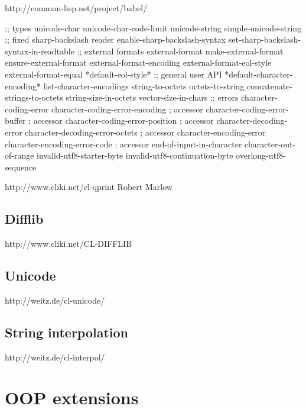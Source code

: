 \documentclass[10pt,english]{book}
\begin{document}
http://common-lisp.net/project/babel/

   ;; types
   unicode-char
   unicode-char-code-limit
   unicode-string
   simple-unicode-string
   ;; fixed sharp-backslash reader
   enable-sharp-backslash-syntax
   set-sharp-backslash-syntax-in-readtable
   ;; external formats
   external-format
   make-external-format
   ensure-external-format
   external-format-encoding
   external-format-eol-style
   external-format-equal
   *default-eol-style*
   ;; general user API
   *default-character-encoding*
   list-character-encodings
   string-to-octets
   octets-to-string
   concatenate-strings-to-octets
   string-size-in-octets
   vector-size-in-chars
   ;; errors
   character-coding-error
   character-coding-error-encoding    ; accessor
   character-coding-error-buffer      ; accessor
   character-coding-error-position    ; accessor
   character-decoding-error
   character-decoding-error-octets    ; accessor
   character-encoding-error
   character-encoding-error-code      ; accessor
   end-of-input-in-character
   character-out-of-range
   invalid-utf8-starter-byte
   invalid-utf8-continuation-byte
   overlong-utf8-sequence


http://www.cliki.net/cl-qprint
Robert Marlow

\section{Difflib}
\label{sec:difflib}

http://www.cliki.net/CL-DIFFLIB

\section{Unicode}
\label{sec:unicode}

http://weitz.de/cl-unicode/

\section{String interpolation}
\label{sec:string-interpolation}

http://weitz.de/cl-interpol/



\chapter{OOP extensions}
\label{cha:oop-extensions}
\end{document}
